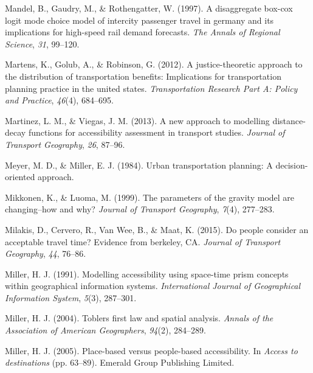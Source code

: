 \documentclass[12pt,twoside]{reedthesis}
\newlength{\cslhangindent}
\newenvironment{CSLReferences}[2] %
 {%
  \setlength{\parindent}{0pt}
  \ifodd #1 \everypar{\setlength{\hangindent}{\cslhangindent}}\ignorespaces\fi
  \ifnum #2 > 0
  \setlength{\parskip}{#2\baselineskip}
  \fi
 }%
 {}
\begin{document}
\begin{CSLReferences}{1}{0}
\leavevmode{}%
Mandel, B., Gaudry, M., \& Rothengatter, W. (1997). A disaggregate box-cox logit mode choice model of intercity passenger travel in germany and its implications for high-speed rail demand forecasts. \emph{The Annals of Regional Science}, \emph{31}, 99--120.

\leavevmode{}%
Martens, K., Golub, A., \& Robinson, G. (2012). A justice-theoretic approach to the distribution of transportation benefits: Implications for transportation planning practice in the united states. \emph{Transportation Research Part A: Policy and Practice}, \emph{46}(4), 684--695.

\leavevmode{}%
Martinez, L. M., \& Viegas, J. M. (2013). A new approach to modelling distance-decay functions for accessibility assessment in transport studies. \emph{Journal of Transport Geography}, \emph{26}, 87--96.

\leavevmode{}%
Meyer, M. D., \& Miller, E. J. (1984). Urban transportation planning: A decision-oriented approach.

\leavevmode{}%
Mikkonen, K., \& Luoma, M. (1999). The parameters of the gravity model are changing--how and why? \emph{Journal of Transport Geography}, \emph{7}(4), 277--283.

\leavevmode{}%
Milakis, D., Cervero, R., Van Wee, B., \& Maat, K. (2015). Do people consider an acceptable travel time? Evidence from berkeley, CA. \emph{Journal of Transport Geography}, \emph{44}, 76--86.

\leavevmode{}%
Miller, H. J. (1991). Modelling accessibility using space-time prism concepts within geographical information systems. \emph{International Journal of Geographical Information System}, \emph{5}(3), 287--301.

\leavevmode{}%
Miller, H. J. (2004). Toblers first law and spatial analysis. \emph{Annals of the Association of American Geographers}, \emph{94}(2), 284--289.

\leavevmode{}%
Miller, H. J. (2005). Place-based versus people-based accessibility. In \emph{Access to destinations} (pp. 63--89). Emerald Group Publishing Limited.


\end{CSLReferences}
\end{document}

